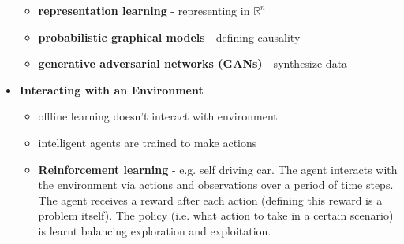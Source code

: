 \documentclass[12pt,notitlepage]{article}
\begin{document}
\begin{itemize}
\begin{itemize}
              \item \textbf{representation learning} - representing in $\mathbb{R}^n$
              \item \textbf{probabilistic graphical models} - defining causality
              \item \textbf{generative adversarial networks (GANs)} - synthesize data
          \end{itemize}
    \item \textbf{Interacting with an Environment}
          \begin{itemize}
              \item offline learning doesn't interact with environment
              \item intelligent agents are trained to make actions
              \item \textbf{Reinforcement learning} - e.g. self driving car. The agent interacts
                    with the environment via actions and observations over a period of time steps. The
                    agent receives a reward after each action (defining this reward is a problem
                    itself). The policy (i.e. what action to take in a certain scenario) is learnt
                    balancing exploration and exploitation.
          \end{itemize}
\end{itemize}
\end{document}
